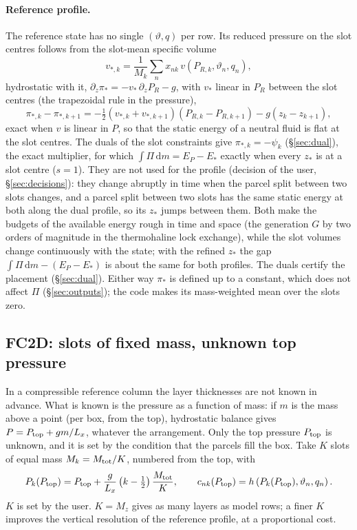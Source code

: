 \documentclass[11pt,a4paper]{article}
\newcommand{\vt}{\vartheta}
\newcommand{\Mtot}{M_{\rm tot}}
\newcommand{\Ptop}{P_{\rm top}}
\newcommand{\zs}{z_{*}}
\begin{document}
\paragraph{Reference profile.} The reference state has no single $(\vt,q)$ per row. Its reduced pressure on the slot centres
follows from the slot-mean specific volume
\begin{equation}
  v_{*,k}=\frac{1}{M_k}\sum_nx_{nk}\,v(P_{R,k},\vt_n,q_n),
\end{equation}
hydrostatic with it, $\partial_z\pi_*=-v_*\,\partial_zP_R-g$, with $v_*$ linear in $P_R$ between the slot centres (the
trapezoidal rule in the pressure),
\begin{equation}
  \pi_{*,k}-\pi_{*,k+1}=-\tfrac12\left(v_{*,k}+v_{*,k+1}\right)\left(P_{R,k}-P_{R,k+1}\right)-g\left(z_k-z_{k+1}\right),
\end{equation}
exact when $v$ is linear in $P$, so that the static energy of a neutral fluid is flat at the slot centres. The duals of
the slot constraints give $\pi_{*,k}=-\psi_k$ (\S\ref{sec:dual}), the exact multiplier, for which
$\int\Pi\,\mathrm{d}m=E_P-E_*$ exactly when every $\zs$ is at a slot centre ($s=1$). They are not used for the profile
(decision of the user, \S\ref{sec:decisions}): they change abruptly in time when the parcel split between two slots
changes, and a parcel split between two slots has the same static energy at both along the dual profile, so its $\zs$
jumps between them. Both make the budgets of the available energy rough in time and space (the generation $G$ by two
orders of magnitude in the thermohaline lock exchange), while the slot volumes change continuously with the state; with
the refined $\zs$ the gap $\int\Pi\,\mathrm{d}m-(E_P-E_*)$ is about the same for both profiles. The duals certify the
placement (\S\ref{sec:dual}). Either way $\pi_*$ is defined up to a constant, which does not affect $\Pi$
(\S\ref{sec:outputs}); the code makes its mass-weighted mean over the slots zero.

\subsection{FC2D: slots of fixed mass, unknown top pressure}\label{sec:fc-slots}
In a compressible reference column the layer thicknesses are not known in advance. What is known is the pressure as a
function of mass: if $m$ is the mass above a point (per box, from the top), hydrostatic balance gives
$P=\Ptop+gm/L_x$, whatever the arrangement. Only the top pressure $\Ptop$ is unknown, and it is set by the condition that
the parcels fill the box. Take $K$ slots of equal mass $M_k=\Mtot/K$, numbered from the top, with
\begin{equation}
  P_k(\Ptop)=\Ptop+\frac{g}{L_x}\left(k-\tfrac12\right)\frac{\Mtot}{K},\qquad c_{nk}(\Ptop)=h\left(P_k(\Ptop),\vt_n,q_n\right).
  \label{eq:fc-cost}
\end{equation}
$K$ is set by the user. $K=M_z$ gives as many layers as model rows; a finer $K$ improves the vertical resolution of the
reference profile, at a proportional cost.
\end{document}
